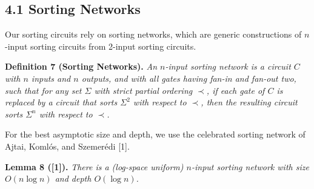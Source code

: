 \documentclass[10pt,a4paper]{article}
\newenvironment{originalresult}[1]{\par\medskip\noindent\textbf{#1.}\itshape}{\par\medskip}
\begin{document}
\subsection*{4.1 Sorting Networks}
Our sorting circuits rely on sorting networks, which are generic constructions of $n$-input sorting circuits from 2-input sorting circuits.
\begin{originalresult}{Definition 7 (Sorting Networks)}
An $n$-input sorting network is a circuit $C$ with $n$ inputs and $n$ outputs, and with all gates having fan-in and fan-out two, such that for any set $\Sigma$ with strict partial ordering $\prec$, if each gate of $C$ is replaced by a circuit that sorts $\Sigma^2$ with respect to $\prec$, then the resulting circuit sorts $\Sigma^n$ with respect to $\prec$.
\end{originalresult}
For the best asymptotic size and depth, we use the celebrated sorting network of Ajtai, Koml\'os, and Szemer\'edi [1].
\begin{originalresult}{Lemma 8 ([1])}
There is a (log-space uniform) $n$-input sorting network with size $O(n\log n)$ and depth $O(\log n)$.
\end{originalresult}
\end{document}
